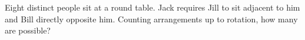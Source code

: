 Eight distinct people sit at a round table. Jack requires Jill to sit adjacent to him and Bill directly opposite him. Counting arrangements up to rotation, how many are possible?
